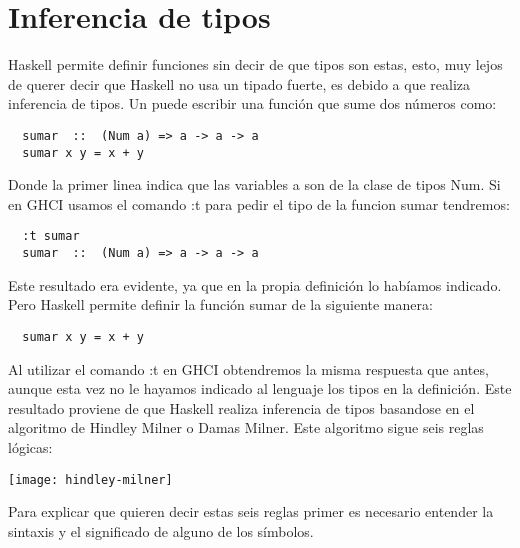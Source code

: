 \section{Inferencia de tipos} %
\label{sec:inferencia_de_tipos}


Haskell permite definir funciones sin decir de que tipos son estas, esto, muy lejos de querer decir que Haskell no usa un tipado fuerte, es debido a que realiza inferencia de tipos.
Un puede escribir una función que sume dos números como:


\begin{lstlisting}
  sumar  ::  (Num a) => a -> a -> a
  sumar x y = x + y
\end{lstlisting}

Donde la primer linea indica que las variables a son de la clase de tipos Num.
Si en GHCI usamos el comando :t para pedir el tipo de la funcion sumar tendremos:


\begin{lstlisting}
  :t sumar
  sumar  ::  (Num a) => a -> a -> a
\end{lstlisting}

Este resultado era evidente, ya que en la propia definición lo habíamos indicado. Pero Haskell permite definir la función sumar de la siguiente manera:

\begin{lstlisting}
  sumar x y = x + y
\end{lstlisting}

Al utilizar el comando :t en GHCI obtendremos la misma respuesta que antes, aunque esta vez no le  hayamos indicado al lenguaje los tipos en la definición.
Este resultado proviene de que Haskell realiza inferencia de tipos basandose en el algoritmo de Hindley Milner o Damas Milner.
Este algoritmo sigue seis reglas lógicas:

\texttt{[image: hindley-milner]}

Para explicar que quieren decir estas seis reglas primer es necesario entender la sintaxis y el significado de alguno de los símbolos.

